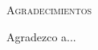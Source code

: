 
\cleardoublepage
\thispagestyle{plain}
{}
\begin{center}
    \vspace*{\fill}
    {\Huge{\textsc{Agradecimientos}}}\\[1cm]

    \begin{minipage}{0.7\textwidth}
        Agradezco a...
    \end{minipage}

    \vspace*{\fill}

\end{center}
